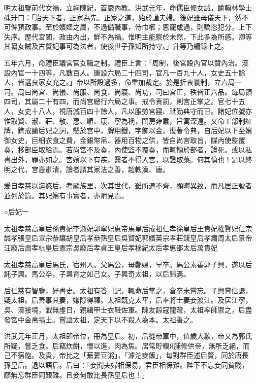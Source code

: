 
明太祖鑒前代女禍，立綱陳紀，首嚴內教。洪武元年，命儒臣修女誡，諭翰林學士硃升曰：「治天下者，正家為先。正家之道，始於謹夫婦。後妃雖母儀天下，然不可俾預政事。至於嬪嬙之屬，不過備職事，侍巾櫛；恩寵或過，則驕恣犯分，上下失序。歷代宮闈，政由內出，鮮不為禍。惟明主能察於未然，下此多為所惑。卿等其纂女誡及古賢妃事可為法者，使後世子孫知所持守。」升等乃編錄上之。

五年六月，命禮臣議宮官女職之制。禮臣上言：「周制，後宮設內官以贊內治。漢設內官一十四等，凡數百人。唐設六局二十四司，官凡一百九十人，女史五十餘人，皆選良家女充之。」帝以所設過多，命重加裁定。於是折衷曩制，立六局一司。局曰尚宮、尚儀、尚服、尚食、尚寢、尚功，司曰宮正，秩皆正六品。每局領四司，其屬二十有四，而尚宮總行六局之事。戒令責罰，則宮正掌之。官七十五人，女史十八人，視唐減百四十餘人，凡以服勞宮寢、祗勤典守而已。諸妃位號亦惟取賢、淑、莊、敬、惠、順、康、寧為稱，閨房雍肅，旨寓深遠。又命工部制紅牌，鐫戒諭后妃之詞，懸於宮中。牌用鐵，字飾以金。復著令典，自后妃以下至嬪御女史，巨細衣食之費，金銀幣帛、器用百物之供，皆自尚宮取旨，牒內使監覆奏，移部臣取給焉。若尚宮不及奏，內使監不覆奏，而輒領於部者，論死。或以私書出外，罪亦如之。宮嬪以下有疾，醫者不得入宮，以證取藥。何其慎也！是以終明之代，宮壼肅清，論者謂其家法之善，超軼漢、唐。

爰自孝慈以迄愍后，考厥族里，次其世代，雖所遇不齊，顯晦異致，而凡居正號者並列於篇。其妃嬪有事實者，亦附見焉。

○后妃一

太祖孝慈高皇后孫貴妃李淑妃郭寧妃惠帝馬皇后成祖仁孝徐皇后王貴妃權賢妃仁宗誠孝張皇后宣宗恭讓胡皇后孝恭孫皇后吳賢妃郭嬪英宗孝莊錢皇后孝肅周太后景帝汪廢后肅孝杭皇后憲宗吳廢后孝貞王皇后孝穆紀太后孝惠邵太后萬貴妃

太祖孝慈高皇后馬氏，宿州人。父馬公，母鄭媼，早卒。馬公素善郭子興，遂以后託子興。馬公卒，子興育之如己女。子興奇太祖，以后歸焉。

后仁慈有智鑒，好書史。太祖有答刂記，輒命后掌之，倉卒未嘗忘。子興嘗信讒，疑太祖。后善事其妻，嫌隙得釋。太祖既克太平，后率將士妻妾渡江。及居江寧，吳、漢接境，戰無虛日，親緝甲士衣鞋佐軍。陳友諒寇龍灣，太祖率師禦之，后盡發宮中金帛犒士。嘗語太祖，定天下以不殺人為本。太祖善之。

洪武元年正月，太祖即帝位，冊為皇后。初，后從帝軍中，值歲大歉，帝又為郭氏所疑，嘗乏食。后竊炊餅，懷以進，肉為焦。居常貯糗Я脯修供帝，無所乏絕，而己不宿飽。及貴，帝比之「蕪蔞豆粥」，「滹沱麥飯」，每對群臣述后賢，同於唐長孫皇后。退以語后。后曰：「妾聞夫婦相保易，君臣相保難。陛下不忘妾同貧賤，願無忘群臣同艱難。且妾何敢比長孫皇后也！」

